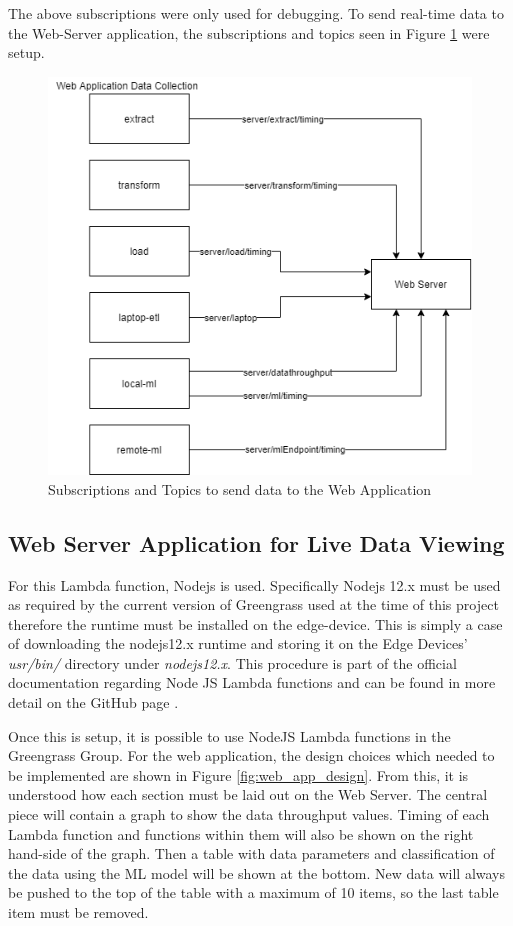The above subscriptions were only used for debugging. To send real-time data to the Web-Server application, the subscriptions and topics seen in Figure \ref{fig:mqqt_to_web_app} were setup.

\begin{figure}[ht]
    \centering
    \includegraphics[width=0.7\linewidth]{pages/Chapter4/Chapter 4 Images/nodejs_mqqt.png}
    \caption{Subscriptions and Topics to send data to the Web Application}
    \label{fig:mqqt_to_web_app}
\end{figure}

\subsection{Web Server Application for Live Data Viewing}
\label{nodejs-server}
For this Lambda function, Nodejs is used. Specifically Nodejs 12.x must be used as required by the current version of Greengrass used at the time of this project therefore the runtime must be installed on the edge-device. This is simply a case of downloading the nodejs12.x runtime and storing it on the Edge Devices' \textit{usr/bin/} directory under \textit{nodejs12.x}. This procedure is part of the official documentation regarding Node JS Lambda functions and can be found in more detail on the GitHub page \cite{aws_greengrass_nodejs12_ghub}.

Once this is setup, it is possible to use NodeJS Lambda functions in the Greengrass Group. For the web application, the design choices which needed to be implemented are shown in Figure \ref{fig:web_app_design}. From this, it is understood how each section must be laid out on the Web Server. The central piece will contain a graph to show the data throughput values. Timing of each Lambda function and functions within them will also be shown on the right hand-side of the graph. Then a table with data parameters and classification of the data using the ML model will be shown at the bottom. New data will always be pushed to the top of the table with a maximum of 10 items, so the last table item must be removed.

